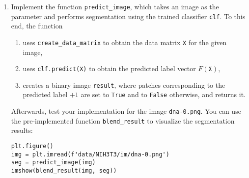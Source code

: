 \documentclass[12pt,a4paper]{article}
\begin{document}
\begin{enumerate}
\begin{enumerate}
    \end{enumerate}
    \item Implement the function \texttt{predict\_image}, which takes an image as the parameter and performs segmentation using the trained classifier \texttt{clf}. To this end, the function
    \begin{enumerate}
        \item uses \texttt{create\_data\_matrix} to obtain the data matrix \texttt{X} for the given image,
        \item uses \texttt{clf.predict(X)} to obtain the predicted label vector $F\left(\texttt{X}\right)$,
        \item creates a binary image \texttt{result}, where patches corresponding to the predicted label $+1$ are set to \texttt{True} and to \texttt{False} otherwise, and returns it.
    \end{enumerate}
    Afterwards, test your implementation for the image \texttt{dna-0.png}. You can use the pre-implemented function \texttt{blend\_result} to visualize the segmentation results:
\begin{Verbatim}[frame=single]
plt.figure()
img = plt.imread(f'data/NIH3T3/im/dna-0.png')
seg = predict_image(img)
imshow(blend_result(img, seg))
\end{Verbatim}

\end{enumerate}
\end{document}
